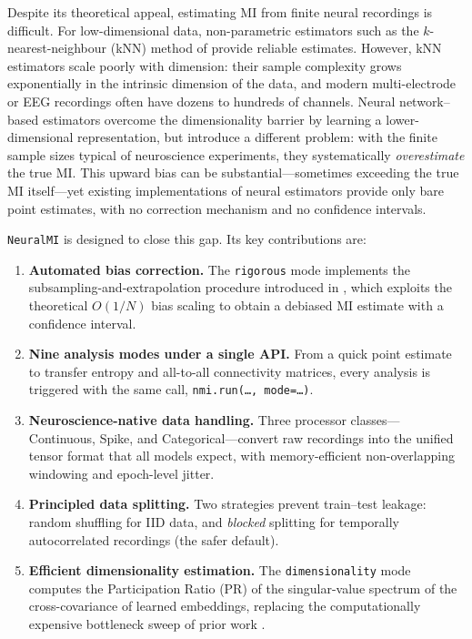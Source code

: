 \documentclass[12pt]{article}
\newcommand{\nmi}{\texttt{NeuralMI}}
\newcommand{\api}[1]{\texttt{#1}}
\begin{document}
Despite its theoretical appeal, estimating MI from finite neural recordings is
difficult.  For low-dimensional data, non-parametric estimators such as the
$k$-nearest-neighbour (kNN) method of \citet{kraskov2004estimating} provide
reliable estimates.  However, kNN estimators scale poorly with dimension:
their sample complexity grows exponentially in the intrinsic dimension of the
data, and modern multi-electrode or EEG recordings often have dozens to
hundreds of channels.  Neural network–based estimators overcome the
dimensionality barrier by learning a lower-dimensional representation, but
introduce a different problem: with the finite sample sizes typical of
neuroscience experiments, they systematically \emph{overestimate} the true MI.
This upward bias can be substantial---sometimes exceeding the true MI
itself---yet existing implementations of neural estimators provide only bare
point estimates, with no correction mechanism and no confidence intervals.

\nmi{} is designed to close this gap.  Its key contributions are:

\begin{enumerate}[leftmargin=*]
  \item \textbf{Automated bias correction.}  The \api{rigorous} mode
        implements the subsampling-and-extrapolation procedure introduced in
        \citet{abdelaleem2025accurate}, which exploits the theoretical
        $O(1/N)$ bias scaling to obtain a debiased MI estimate with a
        confidence interval.

  \item \textbf{Nine analysis modes under a single API.}  From a quick point
        estimate to transfer entropy and all-to-all connectivity matrices,
        every analysis is triggered with the same call,
        \api{nmi.run(\ldots, mode=\ldots)}.

  \item \textbf{Neuroscience-native data handling.}  Three processor
        classes—Continuous, Spike, and Categorical—convert raw recordings into
        the unified tensor format that all models expect, with
        memory-efficient non-overlapping windowing and epoch-level jitter.

  \item \textbf{Principled data splitting.}  Two strategies prevent
        train–test leakage: random shuffling for IID data, and
        \emph{blocked} splitting for temporally autocorrelated recordings
        (the safer default).

  \item \textbf{Efficient dimensionality estimation.}  The \api{dimensionality}
        mode computes the Participation Ratio (PR) of the singular-value
        spectrum of the cross-covariance of learned embeddings, replacing
        the computationally expensive bottleneck sweep of prior work
        \citep{gulati2026mutual}.
\end{enumerate}
\end{document}
